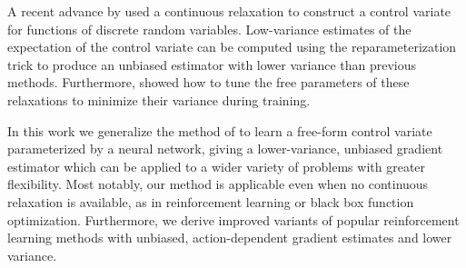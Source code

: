 \documentclass{article}
\begin{document}
A recent advance by \citet{tucker2017rebar} used a continuous relaxation to construct a control variate for functions of discrete random variables.
Low-variance estimates of the expectation of the control variate can be computed using the reparameterization trick to produce an unbiased estimator with lower variance than previous methods.
Furthermore, \citet{tucker2017rebar} showed how to tune the free parameters of these relaxations to minimize their variance during training.

In this work we generalize the method of \citet{tucker2017rebar} to learn a free-form control variate parameterized by a neural network, giving a lower-variance, unbiased gradient estimator which can be applied to a wider variety of problems with greater flexibility.
Most notably, our method is applicable even when no continuous relaxation is available, as in reinforcement learning or black box function optimization.
Furthermore, we derive improved variants of popular reinforcement learning methods with unbiased, action-dependent gradient estimates and lower variance.%

\end{document}
